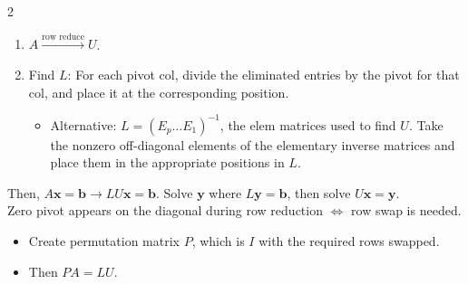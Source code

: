 \documentclass[10pt]{article}
\begin{document}
\begin{multicols*}{2}
\begin{enumerate}
    \item $A \xrightarrow{\text{row reduce}} U$.
    \item Find $L$: For each pivot col, divide the eliminated entries by the pivot for that col, and place it at the corresponding position.
    \begin{itemize}
        \item Alternative: $L = (E_p \dots E_1)^{-1}$, the elem matrices used to find $U$. Take the nonzero off-diagonal elements of the elementary inverse matrices and place them in the appropriate positions in $L$.
    \end{itemize}
\end{enumerate}
Then, $A\mathbf{x}=\mathbf{b} \to LU\mathbf{x}=\mathbf{b}$. Solve $\mathbf{y}$ where $L\mathbf{y}=\mathbf{b}$, then solve $U\mathbf{x}=\mathbf{y}$.\\
Zero pivot appears on the diagonal during row reduction $\Leftrightarrow$ row swap is needed.
\begin{itemize}
    \item Create permutation matrix $P$, which is $I$ with the required rows swapped.
    \item Then $PA=LU$.
\end{itemize}


\end{multicols*}
\end{document}

